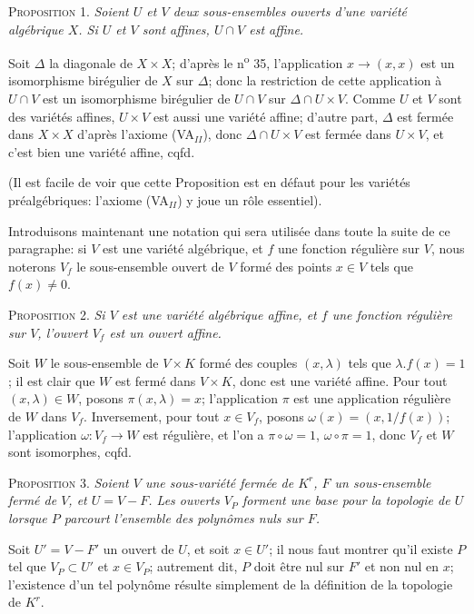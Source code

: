 \textsc{Proposition} 1. \textit{Soient $U$ et $V$ deux sous-ensembles ouverts d'une variété algébrique $X$. Si $U$ et $V$ sont affines, $U \cap V$ est affine.}

Soit $\Delta$ la diagonale de $X \times X$; d'après le n\textsuperscript{o} 35, l'application $x \rightarrow (x, x)$ est un isomorphisme birégulier de $X$ sur $\Delta$; donc la restriction de cette application à $U \cap V$ est un isomorphisme birégulier de $U \cap V$ sur $\Delta \cap U \times V$. Comme $U$ et $V$ sont des variétés affines, $U \times V$ est aussi une variété affine; d'autre part, $\Delta$ est fermée dans $X \times X$ d'après l'axiome (VA$_{II}$), donc $\Delta \cap U \times V$ est fermée dans $U \times V$, et c'est bien une variété affine, cqfd.

(Il est facile de voir que cette Proposition est en défaut pour les variétés préalgébriques: l'axiome (VA$_{II}$) y joue un rôle essentiel).

Introduisons maintenant une notation qui sera utilisée dans toute la suite de ce paragraphe: si $V$ est une variété algébrique, et $f$ une fonction régulière sur $V$, nous noterons $V_f$ le sous-ensemble ouvert de $V$ formé des points $x \in V$ tels que $f(x) \neq 0$.

\textsc{Proposition} 2. \textit{Si $V$ est une variété algébrique affine, et $f$ une fonction régulière sur $V$, l'ouvert $V_f$ est un ouvert affine.}

Soit $W$ le sous-ensemble de $V \times K$ formé des couples $(x, \lambda)$ tels que $\lambda.f(x) = 1$; il est clair que $W$ est fermé dans $V \times K$, donc est une variété affine. Pour tout $(x, \lambda) \in W$, posons $\pi(x, \lambda) = x$; l'application $\pi$ est une application régulière de $W$ dans $V_f$. Inversement, pour tout $x \in V_f$, posons $\omega(x) = (x, 1/f(x))$; l'application $\omega : V_f \rightarrow W$ est régulière, et l'on a $\pi \circ \omega = 1$, $\omega \circ \pi = 1$, donc $V_f$ et $W$ sont isomorphes, cqfd.

\textsc{Proposition} 3. \textit{Soient $V$ une sous-variété fermée de $K^r$, $F$ un sous-ensemble fermé de $V$, et $U = V - F$. Les ouverts $V_P$ forment une base pour la topologie de $U$ lorsque $P$ parcourt l'ensemble des polynômes nuls sur $F$.}

Soit $U' = V - F'$ un ouvert de $U$, et soit $x \in U'$; il nous faut montrer qu'il existe $P$ tel que $V_P \subset U'$ et $x \in V_P$; autrement dit, $P$ doit être nul sur $F'$ et non nul en $x$; l'existence d'un tel polynôme résulte simplement de la définition de la topologie de $K^r$.

